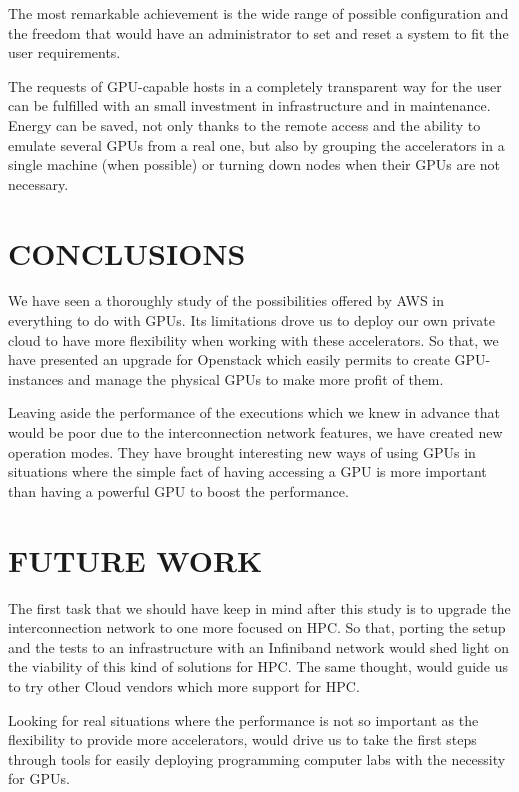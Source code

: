 \documentclass[a4paper,twoside]{article}
\begin{document}
The most remarkable achievement is the wide range of possible configuration and the freedom that would have an administrator to set and reset a system to fit the 
user requirements. 

The requests of GPU-capable hosts in a completely transparent way for the user can be fulfilled with an small investment in infrastructure and in maintenance.
Energy can be saved, not only thanks to the remote access and the ability to emulate several GPUs from a real one, but also  by grouping the accelerators in a single machine (when possible) or turning down nodes when their GPUs are not necessary. 

\section{\uppercase{Conclusions}}
\label{sec:conclusions}
We have seen a thoroughly study of the possibilities offered by AWS in everything to do with GPUs. Its limitations drove us to deploy our own private cloud to have more flexibility when working with these accelerators.
So that, we have presented an upgrade for Openstack which easily permits to create GPU-instances and manage the physical GPUs to make more profit of them.

Leaving aside the performance of the executions which we knew in advance that would be poor due to the interconnection network features, we have created new operation modes. They have brought interesting new ways of using GPUs in situations where the simple fact of having accessing a GPU is more important than having a powerful GPU to boost the performance.

\section{\uppercase{Future work}}
\label{sec:future}
The first task that we should have keep in mind after this study is to upgrade the interconnection network to one more focused on HPC.
So that, porting the setup and the tests to an infrastructure with an Infiniband network would shed light on the viability of this kind of solutions for HPC.
The same thought, would guide us to try other Cloud vendors which more support for HPC.

Looking for real situations where the performance is not so important as the flexibility to provide more accelerators, 
would drive us to take the first steps through tools for easily deploying programming computer labs with the necessity for GPUs.
\end{document}
